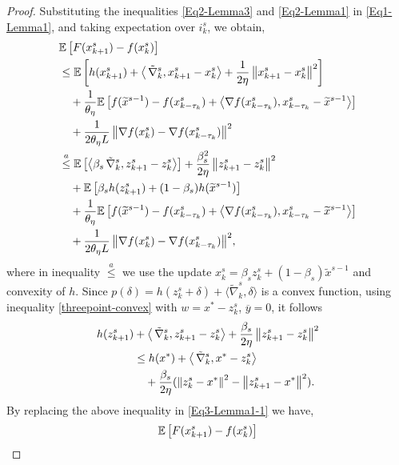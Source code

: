 \begin{proof}
Substituting the inequalities \eqref{Eq2-Lemma3} and \eqref{Eq2-Lemma1} in \eqref{Eq1-Lemma1}, and taking expectation over $i ^s_k$, we obtain,
\begin{gather}\label{Eq3-Lemma1-1}
\begin{split}
&\E \left[ F(x_{k+1}^s) -f(x_{k}^s)\right]\\
&\leq \E\left[h(x_{k+1}^s)+ \Iprod{\VRG}{x_{k+1}^s-x_{k}^s}+{\frac{1}{2\eta}}\norm{x_{k+1}^s-x_{k}^s}^2\right]\\
&~~~+\frac{1}{\theta_{\eta}}\E\left[f(\widetilde{x}^{s-1})-f(x_{k-\tau_k}^s)+\Iprod{\nabla f(x_{k-\tau_k}^s)}{x_{k-\tau_k}^s-\widetilde{x}^{s-1}}\right]\\&
~~~+{\frac{1}{2 \theta_{\eta} L} \norm{\nabla f(x_{k}^s)-\nabla f(x_{k-\tau_k}^s)}^2}\\
&\stackrel{a}{\leq}\E\left[\Iprod{\beta_s\VRG}{z_{k+1}^s-z_{k}^s}\right]+{\frac{ \beta_s^2}{2\eta}}\norm{z_{k+1}^s-z_{k}^s}^2\\
&~~~+\E\left[\beta_s h(z_{k+1}^s)+(1-\beta_s) h(\widetilde{x}^{s-1})\right]\\
&~~~+\frac{1}{\theta_{\eta}}\E\left[f(\widetilde{x}^{s-1})-f(x_{k-\tau_k}^s)+\Iprod{\nabla f(x_{k-\tau_k}^s)}{x_{k-\tau_k}^s-\widetilde{x}^{s-1}}\right]\\
&~~~+{\frac{1}{2 \theta_{\eta} L} \norm{\nabla f(x_{k}^s)-\nabla f(x_{k-\tau_k}^s)}^2},
\end{split}
\raisetag{15pt}
\end{gather}
where in inequality $\stackrel{a}{\leq}$ we use the update $x_k^s = \beta_s z_k^s+(1-\beta_s)\widetilde{x}^{s-1}$ and convexity of $h$. Since   $p(\delta) = h(z_k^s+\delta)+\langle\widetilde{\nabla}_k^s,\delta\rangle$ is a convex function, using inequality \eqref{threepoint-convex} with $w=x^*-z_{k}^s$, $\overline{y} = 0$, it follows
\begin{equation}
\begin{split}
h(z_{k+1}^s) &+ \left\langle \,\tilde{\nabla}_k^s,z_{k+1}^s-z_{k}^s\right\rangle+{\frac{\beta_s}{2\eta}}\left\lVert z_{k+1}^s-z_{k}^s\right\rVert^2  \\
&\leq h(x^*)+\left\langle \,\tilde{\nabla}_k^s,x^* - z_{k}^s\right\rangle\\
&~~~+{\frac{\beta_s}{2\eta}}(\left\lVert z_{k}^s-x^*\right\rVert^2-\left\lVert z_{k+1}^s-x^*\right\rVert^2).  
\end{split}
\end{equation}
By replacing the above inequality in \eqref{Eq3-Lemma1-1} we have,
\begin{gather}\label{Eq3-Lemma1I}
\begin{split}
&\E\left[F(x_{k+1}^s) -f(x_{k}^s)\right]\\

\end{split}
\end{gather}
\end{proof}
